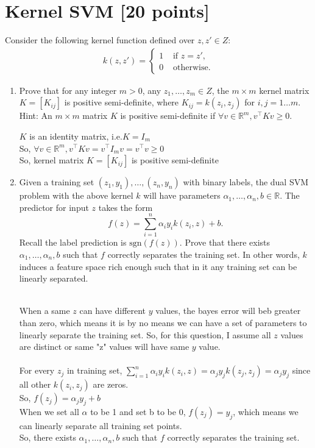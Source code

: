 \documentclass[a4paper]{article}
\theoremstyle{definition}
\newcommand{\sgn}{\mathrm{sgn}}
\def\R{\mathbb R}
\newenvironment{soln}{
    \leavevmode\color{blue}\ignorespaces
}{}
\begin{document}
\section{Kernel SVM [20 points]}
Consider the following kernel function defined over $z,z'\in Z$:
\begin{align*}
k(z,z') =
\begin{cases}
1 & \text{~if~} z=z', \\
0 & \text{~otherwise.}
\end{cases}
\end{align*}
\begin{enumerate}
\item Prove that for any integer $m>0$, any $z_1, \ldots, z_m \in Z$, the $m \times m$ kernel matrix $K=[K_{ij}]$ is positive semi-definite, where $K_{ij}=k(z_i, z_j)$ for $i,j=1\ldots m$.
Hint: An $m\times m$ matrix $K$ is positive semi-definite if $\forall v \in \R^m, v^\top K v \ge 0$.
\begin{soln}

$K$ is an identity matrix, i.e.$ K = I_{m}$\\
So, $\forall v \in \R^m, v^\top K v = v^\top I_{m} v =  v^\top v \ge 0$\\
So, kernel matrix $K=[K_{ij}]$ is positive semi-definite
\end{soln}

\item Given a training set $(z_1, y_1), \ldots, (z_n, y_n)$ with binary labels, the dual SVM problem with the above kernel $k$ will have parameters $\alpha_1, \ldots, \alpha_n, b \in \R$.  The predictor for input $z$ takes the form
$$f(z) = \sum_{i=1}^n \alpha_i y_i k(z_i, z) + b.$$
Recall the label prediction is $\sgn(f(z))$.
Prove that there exists $\alpha_1, \ldots, \alpha_n, b$ such that $f$ correctly separates the training set.
In other words, $k$ induces a feature space rich enough such that in it any training set can be linearly separated.
\begin{soln}
\\When a same $z$ can have different $y$ values, the bayes error will beb greater than zero, which means it is by no means we can have a set of parameters to linearly separate the training set. So, for this question, I assume all $z$ values are distinct or same "z" values will have same $y$ value.
\\\\
For every $z_{j}$ in training set, $ \sum_{i=1}^n \alpha_i y_i k(z_i, z) =  \alpha_j y_j k(z_j, z_j) = \alpha_j y_j$ since all other $k(z_i, z_j)$ are zeros.\\
So, $f(z_{j}) = \alpha_j y_j + b$\\
When we set all $\alpha$ to be 1 and set b to be 0, $f(z_{j}) = y_j$, which means we can linearly separate all training set points.\\
So, there exists $\alpha_1, \ldots, \alpha_n, b$ such that $f$ correctly separates the training set.
\end{soln}



\end{enumerate}
\end{document}
